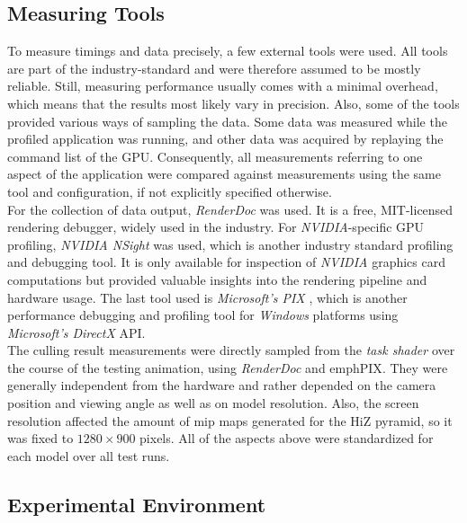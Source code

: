 \subsection*{Measuring Tools} \label{subsec-measuring-tools}

To measure timings and data precisely, a few external tools were used. All tools are part of the 
industry-standard and were therefore assumed to be mostly reliable. Still, measuring performance usually 
comes with a minimal overhead, which means that the results most likely vary in precision. Also, some of 
the tools provided various ways of sampling the data. Some data was measured while the profiled application 
was running, and other data was acquired by replaying the command list of the \ac{GPU}. Consequently, all 
measurements referring to one aspect of the application were compared against measurements using the same 
tool and configuration, if not explicitly specified otherwise. \\

\noindent
For the collection of data output, \emph{RenderDoc} \cite{RenderDoc} was used. It is a free, MIT-licensed 
rendering debugger, widely used in the industry. For \emph{NVIDIA}-specific \ac{GPU} profiling, \emph{NVIDIA NSight} 
\cite{NSight} was used, which is another industry standard profiling and debugging tool. It is only available for 
inspection of \emph{NVIDIA} graphics card computations but provided valuable insights into the rendering pipeline 
and hardware usage. The last tool used is \emph{Microsoft's PIX} \cite{PIX}, which is another performance debugging 
and profiling tool for \emph{Windows} platforms using \emph{Microsoft's DirectX} \ac{API}. \\

\noindent
The culling result measurements were directly sampled from the \emph{task shader} over the course of the testing 
animation, using \emph{RenderDoc} and emph{PIX}. They were generally independent from the hardware and rather 
depended on the camera position and viewing angle as well as on model resolution. Also, the screen resolution 
affected the amount of mip maps generated for the \ac{HiZ} pyramid, so it was fixed to $1280 \times 900$ pixels. 
All of the aspects above were standardized for each model over all test runs.


\subsection*{Experimental Environment} \label{subsec-experimental-environment}

